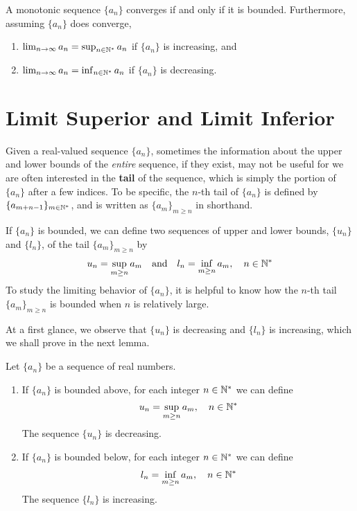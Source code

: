 \documentclass[thmcnt=section, 12pt]{my-elegantbook}
\begin{document}
\begin{theorem} \label{thm:57}
    A monotonic sequence $\{a_n\}$ converges if and only if it is bounded. Furthermore, assuming $\{a_n\}$ does converge, 
    \begin{enumerate}
        \item $\lim_{n \to \infty} a_n = \sup_{n \in \mathbb{N}^\ast} a_n$ if $\{a_n\}$ is increasing, and
        \item $\lim_{n \to \infty} a_n = \inf_{n \in \mathbb{N}^\ast} a_n$ if $\{a_n\}$ is decreasing.
    \end{enumerate}
\end{theorem}


\section{Limit Superior and Limit Inferior}

Given a real-valued sequence $\{a_n\}$, sometimes the information about the upper and lower bounds of the \textit{entire} sequence, if they exist, may not be useful for we are often interested in the \textbf{tail} of the sequence, which is simply the portion of $\{a_n\}$ after a few indices. To be  specific, the $n$-th tail of $\{a_n\}$ is defined by $\{a_{m+n-1}\}_{m \in \mathbb{N}^\ast}$, and is written as $\{a_m\}_{m \geq n}$ in shorthand.

If $\{a_n\}$ is bounded, we can define two sequences of upper and lower bounds, $\{u_n\}$ and $\{l_n\}$, of the tail $\{a_m\}_{m \geq n}$ by
\begin{align*}
    u_n = \sup_{m \geq n} a_m
    \quad \text{and} \quad
    l_n = \inf_{m \geq n} a_m,
    \quad n \in \mathbb{N}^\ast
\end{align*}
To study the limiting behavior of $\{a_n\}$, it is helpful to know how the $n$-th tail $\{a_m\}_{m \geq n}$ is bounded when $n$ is relatively large.

At a first glance, we observe that $\{u_n\}$ is decreasing and $\{l_n\}$ is increasing, which we shall prove in the next lemma.

\begin{lemma} \label{lem:5}
    Let $\{a_n\}$ be a sequence of real numbers.
    \begin{enumerate}
        \item If $\{a_n\}$ is bounded above, for each integer $n \in \mathbb{N}^\ast$ we can define
        \begin{align*}
            u_n = \sup_{m \geq n} a_m,
            \quad n \in \mathbb{N}^\ast
        \end{align*}
        The sequence $\{u_n\}$ is decreasing.
        \item If $\{a_n\}$ is bounded below, for each integer $n \in \mathbb{N}^\ast$ we can define
        \begin{align*}
            l_n = \inf_{m \geq n} a_m,
            \quad n \in \mathbb{N}^\ast
        \end{align*}
        The sequence $\{l_n\}$ is increasing.
    \end{enumerate}
\end{lemma}
\end{document}
